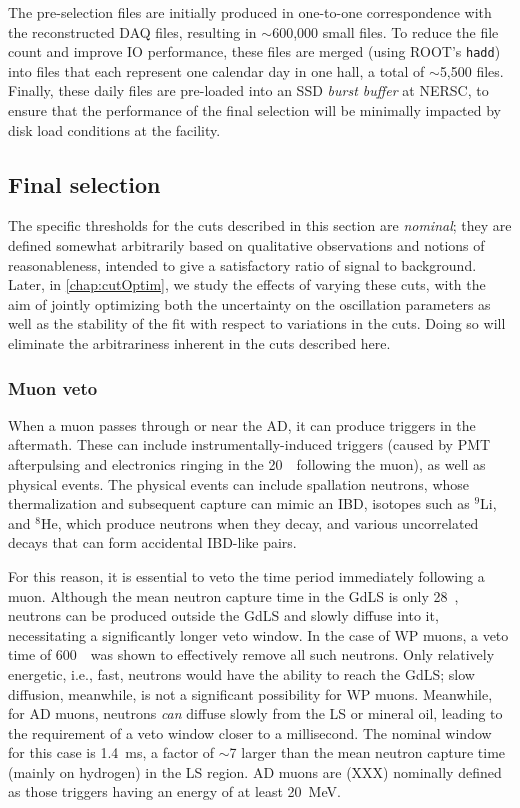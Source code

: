 \documentclass[../thesis.tex]{subfiles}
\begin{document}
The pre-selection files are initially produced in one-to-one correspondence with
the reconstructed DAQ files, resulting in $\sim$600,000 small files. To reduce
the file count and improve IO performance, these files are merged (using ROOT's
\texttt{hadd}) into files that each represent one calendar day in one hall, a
total of $\sim$5,500 files. Finally, these daily files are pre-loaded into an
SSD \emph{burst buffer} at NERSC, to ensure that the performance of the final
selection will be minimally impacted by disk load conditions at the facility.

\subsection{Final selection}
\label{sec:selFinalSel}

The specific thresholds for the cuts described in this section are
\emph{nominal}; they are defined somewhat arbitrarily based on qualitative
observations and notions of reasonableness, intended to give a satisfactory
ratio of signal to background. Later, in \autoref{chap:cutOptim}, we study the
effects of varying these cuts, with the aim of jointly optimizing both the
uncertainty on the oscillation parameters as well as the stability of the fit
with respect to variations in the cuts. Doing so will eliminate the
arbitrariness inherent in the cuts described here.

\subsubsection{Muon veto}
\label{sec:selMuonVeto}

When a muon passes through or near the AD, it can produce triggers in the
aftermath. These can include instrumentally-induced triggers (caused by PMT
afterpulsing and electronics ringing in the 20~\us\ following the muon), as well
as physical events. The physical events can include spallation neutrons, whose
thermalization and subsequent capture can mimic an IBD, isotopes such as $^9$Li,
and $^8$He, which produce neutrons when they decay, and various uncorrelated
decays that can form accidental IBD-like pairs.

For this reason, it is essential to veto the time period immediately following a
muon. Although the mean neutron capture time in the GdLS is only 28~\us,
neutrons can be produced outside the GdLS and slowly diffuse into it,
necessitating a significantly longer veto window. In the case of WP muons, a
veto time of 600~\us\ was shown to effectively remove all such neutrons. Only
relatively energetic, i.e., fast, neutrons would have the ability to reach the
GdLS; slow diffusion, meanwhile, is not a significant possibility for WP
muons. Meanwhile, for AD muons, neutrons \emph{can} diffuse slowly from the LS
or mineral oil, leading to the requirement of a veto window closer to a
millisecond. The nominal window for this case is 1.4~ms, a factor of $\sim$7
larger than the mean neutron capture time (mainly on hydrogen) in the LS
region. AD muons are (XXX) nominally defined as those triggers having an energy
of at least 20~MeV.
\end{document}
